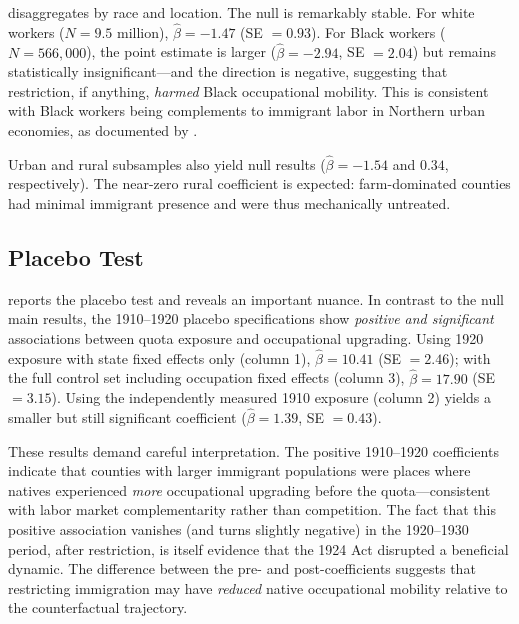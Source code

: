 \documentclass[12pt]{article}
\begin{document}


 disaggregates by race and location.  The null is remarkably stable.  For white workers ($N = 9.5$ million), $\hat{\beta} = -1.47$ (SE $= 0.93$).  For Black workers ($N = 566{,}000$), the point estimate is larger ($\hat{\beta} = -2.94$, SE $= 2.04$) but remains statistically insignificant---and the direction is negative, suggesting that restriction, if anything, \textit{harmed} Black occupational mobility.  This is consistent with Black workers being complements to immigrant labor in Northern urban economies, as documented by \citet{boustan2009competition}.

Urban and rural subsamples also yield null results ($\hat{\beta} = -1.54$ and $0.34$, respectively).  The near-zero rural coefficient is expected: farm-dominated counties had minimal immigrant presence and were thus mechanically untreated.

\subsection{Placebo Test}



 reports the placebo test and reveals an important nuance.  In contrast to the null main results, the 1910--1920 placebo specifications show \textit{positive and significant} associations between quota exposure and occupational upgrading.  Using 1920 exposure with state fixed effects only (column 1), $\hat{\beta} = 10.41$ (SE $= 2.46$); with the full control set including occupation fixed effects (column 3), $\hat{\beta} = 17.90$ (SE $= 3.15$).  Using the independently measured 1910 exposure (column 2) yields a smaller but still significant coefficient ($\hat{\beta} = 1.39$, SE $= 0.43$).

These results demand careful interpretation.  The positive 1910--1920 coefficients indicate that counties with larger immigrant populations were places where natives experienced \textit{more} occupational upgrading before the quota---consistent with labor market complementarity rather than competition.  The fact that this positive association vanishes (and turns slightly negative) in the 1920--1930 period, after restriction, is itself evidence that the 1924 Act disrupted a beneficial dynamic.  The difference between the pre- and post-coefficients suggests that restricting immigration may have \textit{reduced} native occupational mobility relative to the counterfactual trajectory.
\end{document}

